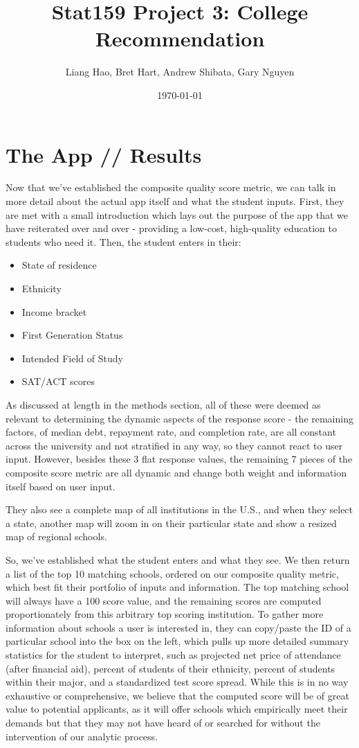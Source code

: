 \documentclass{article}\usepackage[]{graphicx}\usepackage[]{color}
\title{Stat159 Project 3: College Recommendation}
\author{Liang Hao, Bret Hart, Andrew Shibata, Gary Nguyen}
\date{\today}
\begin{document}
\maketitle
\section{The App // Results}


Now that we've established the composite quality score metric, we can talk in more detail about the actual app itself and what the student inputs. First, they are met with a small introduction which lays out the purpose of the app that we have reiterated over and over - providing a low-cost, high-quality education to students who need it. Then, the student enters in their:
\begin{itemize}
\item State of residence
\item Ethnicity
\item Income bracket
\item First Generation Status
\item Intended Field of Study
\item SAT/ACT scores
\end{itemize}

As discussed at length in the methods section, all of these were deemed as relevant to determining the dynamic aspects of the response score - the remaining factors, of median debt, repayment rate, and completion rate, are all constant across the university and not stratified in any way, so they cannot react to user input. However, besides these 3 flat response values, the remaining 7 pieces of the composite score metric are all dynamic and change both weight and information itself based on user input.\newline

They also see a complete map of all institutions in the U.S., and when they select a state, another map will zoom in on their particular state and show a resized map of regional schools.\newline

So, we've established what the student enters and what they see. We then return a list of the top 10 matching schools, ordered on our composite quality metric, which best fit their portfolio of inputs and information. The top matching school will always have a 100 score value, and the remaining scores are computed proportionately from this arbitrary top scoring institution. To gather more information about schools a user is interested in, they can copy/paste the ID of a particular school into the box on the left, which pulls up more detailed summary statistics for the student to interpret, such as projected net price of attendance (after financial aid), percent of students of their ethnicity, percent of students within their major, and a standardized test score spread. While this is in no way exhaustive or comprehensive, we believe that the computed score will be of great value to potential applicants, as it will offer schools which empirically meet their demands but that they may not have heard of or searched for without the intervention of our analytic process. 
\end{document}

